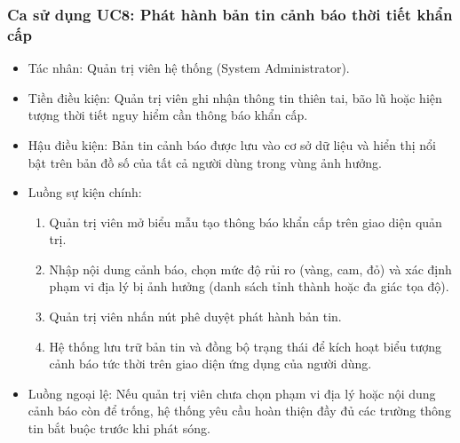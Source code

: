 \subsubsection{Ca sử dụng UC8: Phát hành bản tin cảnh báo thời tiết khẩn cấp}
\begin{itemize}
    \item Tác nhân: Quản trị viên hệ thống (System Administrator).
    \item Tiền điều kiện: Quản trị viên ghi nhận thông tin thiên tai, bão lũ hoặc hiện tượng thời tiết nguy hiểm cần thông báo khẩn cấp.
    \item Hậu điều kiện: Bản tin cảnh báo được lưu vào cơ sở dữ liệu và hiển thị nổi bật trên bản đồ số của tất cả người dùng trong vùng ảnh hưởng.
    \item Luồng sự kiện chính:
    \begin{enumerate}
        \item Quản trị viên mở biểu mẫu tạo thông báo khẩn cấp trên giao diện quản trị.
        \item Nhập nội dung cảnh báo, chọn mức độ rủi ro (vàng, cam, đỏ) và xác định phạm vi địa lý bị ảnh hưởng (danh sách tỉnh thành hoặc đa giác tọa độ).
        \item Quản trị viên nhấn nút phê duyệt phát hành bản tin.
        \item Hệ thống lưu trữ bản tin và đồng bộ trạng thái để kích hoạt biểu tượng cảnh báo tức thời trên giao diện ứng dụng của người dùng.
    \end{enumerate}
    \item Luồng ngoại lệ: Nếu quản trị viên chưa chọn phạm vi địa lý hoặc nội dung cảnh báo còn để trống, hệ thống yêu cầu hoàn thiện đầy đủ các trường thông tin bắt buộc trước khi phát sóng.
\end{itemize}

